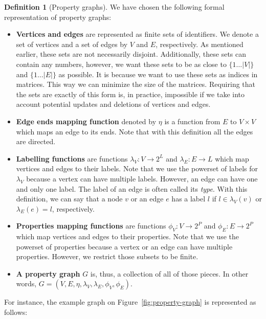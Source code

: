 \documentclass[14pt]{constructor-thesis}
\theoremstyle{definition}
\newtheorem{definition}{Definition}
\begin{document}
\begin{definition}[Property graphs]
  We have chosen the following formal representation of property graphs:
  \begin{itemize}
    \item \textbf{Vertices and edges} are represented as finite sets of identifiers. We denote a set of vertices and a set of edges by $V$ and $E$, respectively. As mentioned earlier, these sets are not necessarily disjoint. Additionally, these sets can contain any numbers, however, we want these sets to be as close to $\{1 \dots |V|\}$ and $\{1 \dots |E|\}$ as possible. It is because we want to use these sets as indices in matrices. This way we can minimize the size of the matrices. Requiring that the sets are exactly of this form is, in practice, impossible if we take into account potential updates and deletions of vertices and edges.
    \item \textbf{Edge ends mapping function} denoted by $\eta$ is a function from $E$ to $V \times V$ which maps an edge to its ends. Note that with this definition all the edges are directed.
    \item \textbf{Labelling functions} are functions $\lambda_V : V \to 2^L$ and $\lambda_E : E \to L$ which map vertices and edges to their labels. Note that we use the powerset of labels for $\lambda_V$ because a vertex can have multiple labels. However, an edge can have one and only one label. The label of an edge is often called its \textit{type}. With this definition, we can say that a node $v$ or an edge $e$ has a label $l$ if $l \in \lambda_V(v)$ or $\lambda_E(e) = l$, respectively.
    \item \textbf{Properties mapping functions} are functions $\phi_V : V \to 2^P$ and $\phi_E : E \to 2^P$ which map vertices and edges to their properties. Note that we use the powerset of properties because a vertex or an edge can have multiple properties. However, we restrict those subsets to be finite.
    \item \textbf{A property graph} $G$ is, thus, a collection of all of those pieces. In other words, $G = (V, E, \eta, \lambda_V, \lambda_E, \phi_V, \phi_E)$.
  \end{itemize}
\end{definition}

For instance, the example graph on Figure~\ref{fig:property-graph} is represented as follows:
\end{document}
